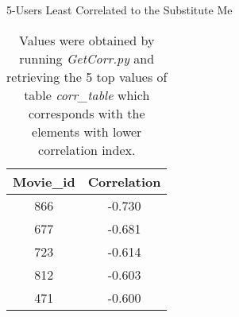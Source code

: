 \begin{table}[!htbp]
	\caption{5-Users Least Correlated to the Substitute Me} \label{tab:bottom-corr}
	\begin{center}
	\vspace{-5mm}
		\begin{tabular}{ c c }
			\hline
			\multicolumn{1}{c}{Movie\_id} & \multicolumn{1}{c}{Correlation}\\
			\hline
			866    &     -0.730\\
			677    &     -0.681\\
			723    &     -0.614\\
			812    &     -0.603\\
			471    &     -0.600\\
			\hline
		\end{tabular}
	\caption*{\scriptsize Values were obtained by running \textit{GetCorr.py} and retrieving the 5 top values of table \textit{corr\_table} which corresponds with the elements with lower correlation index.}
	 \end{center}
\end{table}